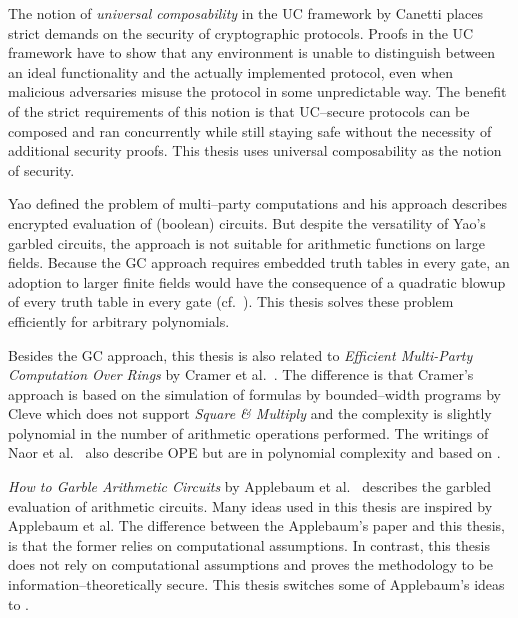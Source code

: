 %
%
\label{sec:related-work}

The notion of \emph{universal composability} in the UC framework by Canetti
\cite{canetti05} places strict demands on the security of cryptographic
protocols. Proofs in the UC framework have to show that any environment is
unable to distinguish between an ideal functionality and the actually
implemented protocol, even when malicious adversaries misuse the protocol in
some unpredictable way. The benefit of the strict requirements of this notion is
that UC--secure protocols can be composed and ran concurrently while still
staying safe without the necessity of additional security proofs. This thesis
uses universal composability as the notion of security.

Yao defined the problem of multi--party computations and his  approach \cite{yao86} describes encrypted evaluation of (boolean)
circuits. But despite the versatility of Yao's garbled circuits, the approach is
not suitable for arithmetic functions on large fields. Because the GC approach
requires embedded truth tables in every gate, an adoption to larger finite
fields would have the consequence of a quadratic blowup of every truth table in
every gate (cf.\ \cite{naor99privacy}). This thesis solves these problem
efficiently for arbitrary polynomials.

Besides the GC approach, this thesis is also related to \emph{Efficient
Multi-Party Computation Over Rings} by Cramer et al.\ \cite{cramer03}. The
difference is that Cramer's approach is based on the simulation of formulas by
bounded--width programs by Cleve \cite{cleve91} which does not support
\emph{Square \& Multiply} \cite{knuth81} and the complexity is slightly
polynomial in the number of arithmetic operations performed. The writings of
Naor et al.\ \cite{naor99,naor06} also describe OPE but are in polynomial
complexity and based on  \cite{rabin81}.

\emph{How to Garble Arithmetic Circuits} by Applebaum et al.\ \cite{gac2012}
describes the garbled evaluation of arithmetic circuits.  Many ideas used in
this thesis are inspired by Applebaum et al. The difference between the
Applebaum's paper and this thesis, is that the former relies on computational
assumptions. In contrast, this thesis does not rely on computational assumptions
and proves the methodology to be information--theoretically secure. This thesis
switches some of Applebaum's ideas to  \cite{davidgoliath}.

